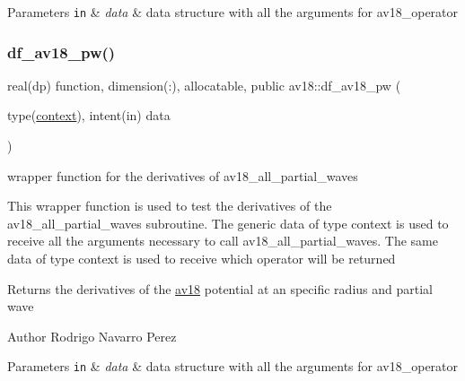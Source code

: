 \begin{DoxyParams}[1]{Parameters}
\mbox{\tt in}  & {\em data} & data structure with all the arguments for av18\+\_\+operator \\
\hline
\end{DoxyParams}
\mbox{\label{namespaceav18_a8b7b43084d226bd7404444269717d26c}} 
\subsubsection{\texorpdfstring{df\+\_\+av18\+\_\+pw()}{df\_av18\_pw()}}
{\footnotesize\ttfamily real(dp) function, dimension(\+:), allocatable, public av18\+::df\+\_\+av18\+\_\+pw (\begin{DoxyParamCaption}\item[{type(\hyperlink{structnum__recipes_1_1context}{context}), intent(in)}]{data }\end{DoxyParamCaption})}



wrapper function for the derivatives of av18\+\_\+all\+\_\+partial\+\_\+waves 

This wrapper function is used to test the derivatives of the av18\+\_\+all\+\_\+partial\+\_\+waves subroutine. The generic data of type context is used to receive all the arguments necessary to call av18\+\_\+all\+\_\+partial\+\_\+waves. The same data of type context is used to receive which operator will be returned

\begin{DoxyReturn}{Returns}
the derivatives of the \hyperlink{namespaceav18}{av18} potential at an specific radius and partial wave
\end{DoxyReturn}
\begin{DoxyAuthor}{Author}
Rodrigo Navarro Perez
\end{DoxyAuthor}

\begin{DoxyParams}[1]{Parameters}
\mbox{\tt in}  & {\em data} & data structure with all the arguments for av18\+\_\+operator \\
\hline
\end{DoxyParams}
\mbox{\label{namespaceav18_af5419f35a68d9a2059fce4f02afd9af4}} 
